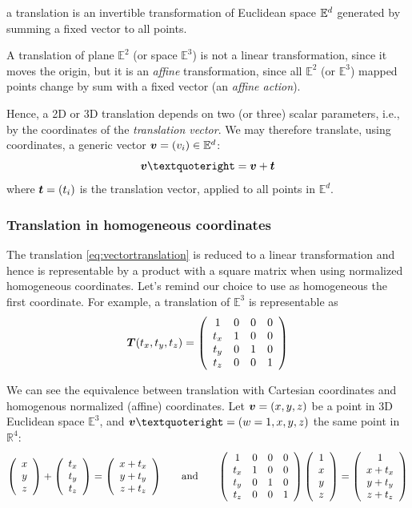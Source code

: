 \begin{coding}
\begin{definition}
a translation is an invertible transformation of Euclidean space $\mathbb{E}^d$ generated by summing a fixed vector to all points.

A translation of plane $\mathbb{E}^2$ (or space $\mathbb{E}^3$) is not a linear transformation, since it moves the origin, but it is an \emph{affine} transformation, since all $\mathbb{E}^2$ (or $\mathbb{E}^3$) mapped points change by sum with a fixed vector (an \emph{affine action}). 
\end{definition}

Hence, a 2D or 3D translation depends on two (or three) scalar parameters, i.e., by the coordinates of the \emph{translation vector}.
We may therefore translate, using coordinates, a generic vector ${\mbox{\boldmath $v$}} = (v_i)\in\mathbb{E}^d$:
\begin{equation}
\v{v}’ = \v{v} + \v{t}
\label{eq:vectortranslation}
\end{equation}
where ${\mbox{\boldmath $t$}} = ({t}_i)$ is the translation vector, applied to all points in $\mathbb{E}^d$.




\subsubsection*{Translation in homogeneous coordinates}

The translation \ref{eq:vectortranslation} is reduced to a linear transformation and hence is representable by a product with a square matrix when using normalized homogeneous coordinates. Let’s remind our choice to use as homogeneous the first coordinate. 
For example, a translation of $\mathbb{E}^3$ is representable as
\begin{equation}
{\mbox{\boldmath $T$}}(t_x,t_y,t_z) = {\left(\begin{array}{cccccccc}1 & 0 & 0 & 0\\t_x & 1 & 0 & 0\\t_y & 0 & 1 & 0\\t_z & 0 & 0 & 1\end{array}\right)}
\end{equation}

We can see the equivalence between translation with Cartesian coordinates and homogenous normalized (affine) coordinates. Let ${\mbox{\boldmath $v$}} = (x,y,z)$ be a point in 3D Euclidean space $\mathbb{E}^3$, and $\v{v}’ = (w=1,x,y,z)$ the same point in $\mathbb{R}^4$:
\[
{\left(\begin{array}{cccccccc}x\\y\\z\end{array}\right)} + {\left(\begin{array}{cccccccc}t_x\\t_y\\t_z\end{array}\right)} = {\left(\begin{array}{cccccccc}x+t_x\\y+t_y\\z+t_z\end{array}\right)}
\qquad\mbox{and}\qquad
{\left(\begin{array}{cccccccc}1 & 0 & 0 & 0\\
	t_x & 1 & 0 & 0\\
	t_y & 0 & 1 & 0\\
	t_z & 0 & 0 & 1\end{array}\right)} \, 
	{\left(\begin{array}{cccccccc}1\\x\\y\\z\end{array}\right)} = {\left(\begin{array}{cccccccc}1\\x+t_x\\y+t_y\\z+t_z\end{array}\right)}
\]


\end{coding}
